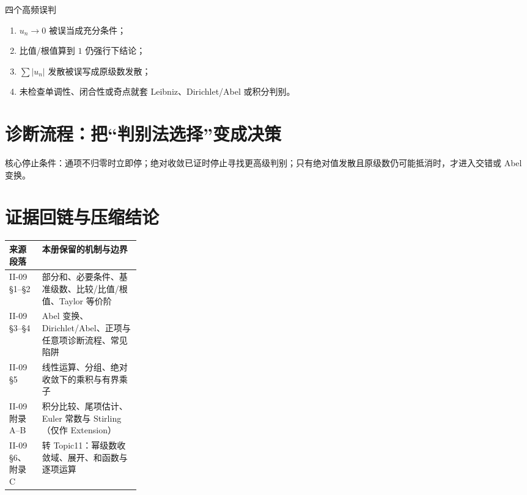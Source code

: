 \documentclass[11pt,a4paper,fontset=fandol]{ctexart}
\begin{document}
\begin{warnbox}{四个高频误判}
\begin{enumerate}
  \item $u_n\to0$ 被误当成充分条件；
  \item 比值/根值算到 $1$ 仍强行下结论；
  \item $\sum\lvert u_n\rvert$ 发散被误写成原级数发散；
  \item 未检查单调性、闭合性或奇点就套 Leibniz、Dirichlet/Abel 或积分判别。
\end{enumerate}
\end{warnbox}

\section{诊断流程：把“判别法选择”变成决策}
\begin{center}
\end{center}
核心停止条件：通项不归零时立即停；绝对收敛已证时停止寻找更高级判别；只有绝对值发散且原级数仍可能抵消时，才进入交错或 Abel 变换。

\section{证据回链与压缩结论}
\begin{tabularx}{\linewidth}{L{0.25\linewidth}Y}
\toprule
来源段落 & 本册保留的机制与边界 \\
\midrule
II-09 §1--§2 & 部分和、必要条件、基准级数、比较/比值/根值、Taylor 等价阶 \\
II-09 §3--§4 & Abel 变换、Dirichlet/Abel、正项与任意项诊断流程、常见陷阱 \\
II-09 §5 & 线性运算、分组、绝对收敛下的乘积与有界乘子 \\
II-09 附录 A--B & 积分比较、尾项估计、Euler 常数与 Stirling（仅作 Extension） \\
II-09 §6、附录 C & 转 Topic11：幂级数收敛域、展开、和函数与逐项运算 \\
\bottomrule
\end{tabularx}
\end{document}
